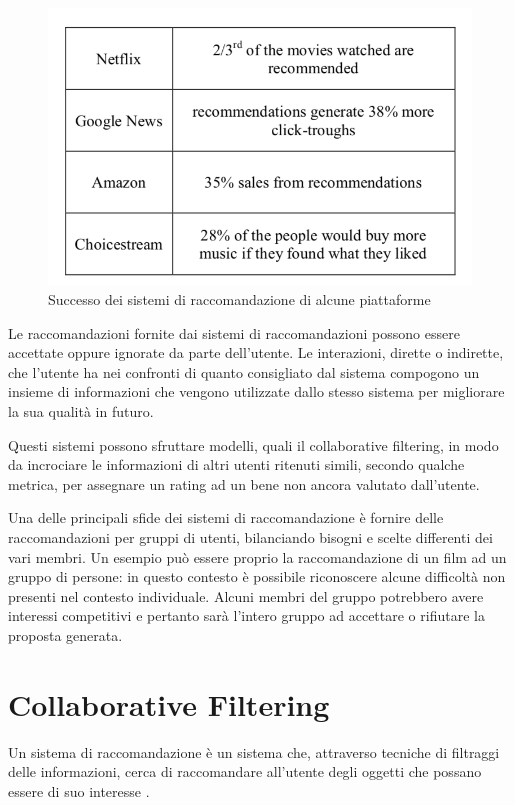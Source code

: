 \documentclass[letterpaper]{article}
\begin{document}
\begin{figure}[!htb]
    \begin{centering}
        \includegraphics[width=\linewidth]{Figures/successo.png}
        \caption{Successo dei sistemi di raccomandazione di alcune piattaforme \cite{ref1}}
        \label{fig:successo}
    \end{centering}
\end{figure}

Le raccomandazioni fornite dai sistemi di raccomandazioni possono essere accettate oppure ignorate da parte dell'utente. Le interazioni, dirette o indirette, che l'utente ha nei confronti di quanto consigliato dal sistema compogono un insieme di informazioni che vengono utilizzate dallo stesso sistema per migliorare la sua qualità in futuro.

Questi sistemi possono sfruttare modelli, quali il collaborative filtering, in modo da incrociare le informazioni di altri utenti ritenuti simili, secondo qualche metrica, per assegnare un rating ad un bene non ancora valutato dall'utente.

Una delle principali sfide dei sistemi di raccomandazione è fornire delle raccomandazioni per gruppi di utenti, bilanciando bisogni e scelte differenti dei vari membri. Un esempio può essere proprio la raccomandazione di un film ad un gruppo di persone: in questo contesto è possibile riconoscere alcune difficoltà non presenti nel contesto individuale. Alcuni membri del gruppo potrebbero avere interessi competitivi e pertanto sarà l'intero gruppo ad accettare o rifiutare la proposta generata.

\section{Collaborative Filtering}
Un sistema di raccomandazione è un sistema che, attraverso tecniche di filtraggi delle informazioni, cerca di raccomandare all'utente degli oggetti che possano essere di suo interesse \cite{ref2}. 
\end{document}
